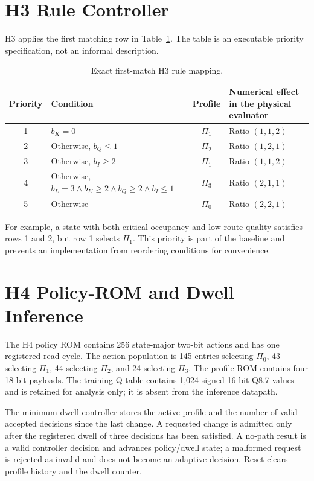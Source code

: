 \section{H3 Rule Controller}

H3 applies the first matching row in Table~\ref{tab:h3-rules}. The table is an
executable priority specification, not an informal description.

\begin{table}[H]
\centering
\caption{Exact first-match H3 rule mapping.}
\label{tab:h3-rules}
\begin{tabularx}{\textwidth}{@{}c X c X@{}}
\toprule
\textbf{Priority} & \textbf{Condition} & \textbf{Profile} & \textbf{Numerical
effect in the physical evaluator}\\
\midrule
1 & $b_K=0$ & $\Pi_1$ & Ratio $(1,1,2)$\\
2 & Otherwise, $b_Q\le1$ & $\Pi_2$ & Ratio $(1,2,1)$\\
3 & Otherwise, $b_I\ge2$ & $\Pi_1$ & Ratio $(1,1,2)$\\
4 & Otherwise, $b_L=3\land b_K\ge2\land b_Q\ge2\land b_I\le1$ & $\Pi_3$ &
Ratio $(2,1,1)$\\
5 & Otherwise & $\Pi_0$ & Ratio $(2,2,1)$\\
\bottomrule
\end{tabularx}
\end{table}

For example, a state with both critical occupancy and low route-quality satisfies
rows 1 and 2, but row 1 selects $\Pi_1$. This priority is part of the baseline and
prevents an implementation from reordering conditions for convenience.

\section{H4 Policy-ROM and Dwell Inference}

The H4 policy ROM contains 256 state-major two-bit actions and has one registered
read cycle. The action population is 145 entries selecting $\Pi_0$, 43 selecting
$\Pi_1$, 44 selecting $\Pi_2$, and 24 selecting $\Pi_3$. The profile ROM contains
four 18-bit payloads. The training Q-table contains 1,024 signed 16-bit Q8.7 values
and is retained for analysis only; it is absent from the inference datapath.

The minimum-dwell controller stores the active profile and the number of valid
accepted decisions since the last change. A requested change is admitted only after
the registered dwell of three decisions has been satisfied. A no-path result is a
valid controller decision and advances policy/dwell state; a malformed request is
rejected as invalid and does not become an adaptive decision. Reset clears profile
history and the dwell counter.

